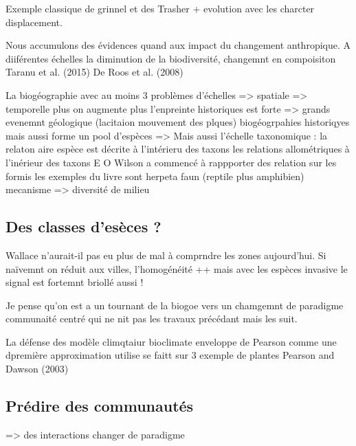 Exemple classique de grinnel et des Trasher + evolution avec les
charcter displacement.

Nous accumulons des évidences quand aux impact du changement
anthropique. A diiférentes échelles la diminution de la biodiversité,
changemnt en compoisiton Taranu et al. (2015) De Roos et al. (2008)

La biogéographie avec au moins 3 problèmes d'échelles =\textgreater{}
spatiale =\textgreater{} temporelle plus on augmente plus l'enpreinte
historiques est forte =\textgreater{} grands evenemnt géologique
(lacitaion mouvement des plques) biogéogrpahies historiqyes mais aussi
forme un pool d'espèces =\textgreater{} Mais aussi l'échelle taxonomique
: la relaton aire espèce est décrite à l'intérieru des taxons les
relations allométriques à l'inérieur des taxons E O Wilson a commencé à
rappporter des relation sur les formis les exemples du livre sont
herpeta faun (reptile plus amphibien) mecanisme =\textgreater{}
diversité de milieu

\subsection{Des classes d'esèces ?}\label{des-classes-desuxe8ces}

Wallace n'aurait-il pas eu plus de mal à comprndre les zones
aujourd'hui. Si naïvemnt on réduit aux villes, l'homogénéité ++ mais
avec les espèces invasive le signal est fortemnt briollé aussi !

Je pense qu'on est a un tournant de la biogoe vers un chamgemnt de
paradigme communaité centré qui ne nit pas les travaux précédant mais
les suit.

La défense des modèle climqtaiur bioclimate enveloppe de Pearson comme
une dpremière approximation utilise se faitt sur 3 exemple de plantes
Pearson and Dawson (2003)

\subsection{Prédire des
communautés}\label{pruxe9dire-des-communautuxe9s}

=\textgreater{} des interactions changer de paradigme

